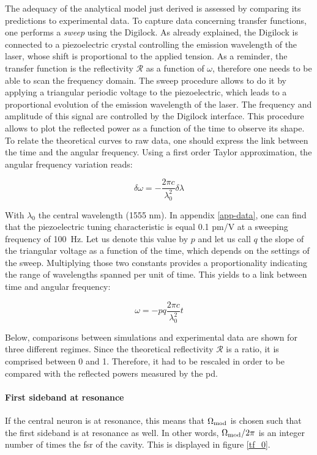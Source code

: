 The adequacy of the analytical model just derived is assessed by comparing its predictions to experimental data. To capture data concerning transfer functions, one performs a \textit{sweep} using the Digilock. As already explained, the Digilock is connected to a piezoelectric crystal controlling the emission wavelength of the laser, whose shift is proportional to the applied tension. As a reminder, the transfer function is the reflectivity $\mathcal{R}$ as a function of $\omega$, therefore one needs to be able to scan the frequency domain. The sweep procedure allows to do it by applying a triangular periodic voltage to the piezoelectric, which leads to a proportional evolution of the emission wavelength of the laser. The frequency and amplitude of this signal are controlled by the Digilock interface. This procedure allows to plot the reflected power as a function of the time to observe its shape.\\

To relate the theoretical curves to raw data, one should express the link between the time and the angular frequency. Using a first order Taylor approximation, the angular frequency variation reads:

\begin{equation}
	\delta \omega = -\frac{2\pi c}{\lambda_0^2} \delta \lambda
\end{equation}

With $\lambda_0$ the central wavelength (1555 nm). In appendix \ref{app-data}, one can find that the piezoelectric tuning characteristic is equal 0.1 pm/V at a sweeping frequency of \SI{100}{\Hz}. Let us denote this value by $p$ and let us call $q$ the slope of the triangular voltage as a function of the time, which depends on the settings of the sweep. Multiplying those two constants provides a proportionality indicating the range of wavelengths spanned per unit of time. This yields to a link between time and angular frequency:

\begin{equation}
	\omega = - p q \frac{2 \pi c}{\lambda_0^2} t
	\label{eq-omega-vs-t}
\end{equation}

Below, comparisons between simulations and experimental data are shown for three different regimes. Since the theoretical reflectivity $\mathcal{R}$ is a ratio, it is comprised between 0 and 1. Therefore, it had to be rescaled in order to be compared with the reflected powers measured by the \gls{pd}.

\paragraph{First sideband at resonance} If the central neuron is at resonance, this means that $\Omega_{\text{mod}}$ is chosen such that the first sideband is at resonance as well. In other words, $\Omega_{\text{mod}}/2\pi$ is an integer number of times the \gls{fsr} of the cavity. This is displayed in figure \ref{tf_0}.

